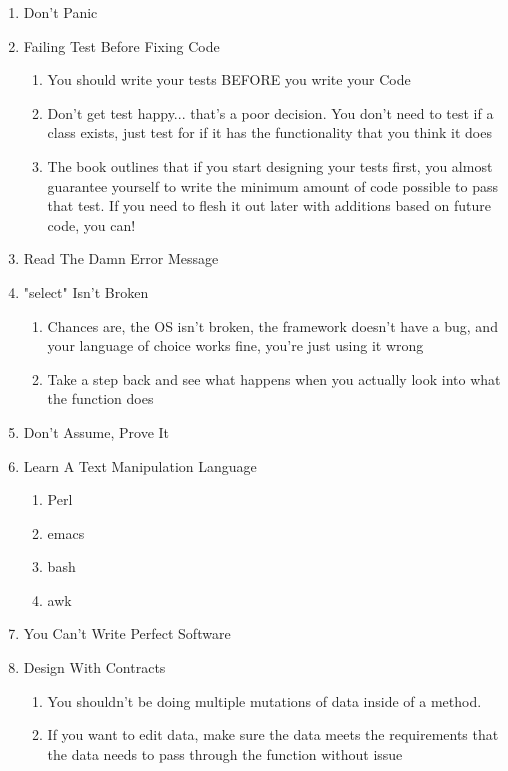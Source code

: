 \documentclass{article}
\begin{document}
\begin{enumerate}
    \item Don't Panic
    \item Failing Test Before Fixing Code
        \begin{enumerate}
            \item You should write your tests BEFORE you write your Code
            \item Don't get test happy... that's a poor decision. You don't need to test if a class exists, just test for if it has the functionality that you think it does
            \item The book outlines that if you start designing your tests first, you almost guarantee yourself to write the minimum amount of code possible to pass that test. If you need to flesh it out later with additions based on future code, you can!
        \end{enumerate}
    \item Read The Damn Error Message
    \item "select" Isn't Broken
        \begin{enumerate}
            \item Chances are, the OS isn't broken, the framework doesn't have a bug, and your language of choice works fine, you're just using it wrong
            \item Take a step back and see what happens when you actually look into what the function does
        \end{enumerate}
    \item Don't Assume, Prove It
    \item Learn A Text Manipulation Language
        \begin{enumerate}
            \item Perl
            \item emacs
            \item bash
            \item awk
        \end{enumerate}
    \item You Can't Write Perfect Software
    \item Design With Contracts
        \begin{enumerate}
            \item You shouldn't be doing multiple mutations of data inside of a method. 
            \item If you want to edit data, make sure the data meets the requirements that the data needs to pass through the function without issue
        \end{enumerate}

\end{enumerate}
\end{document}
